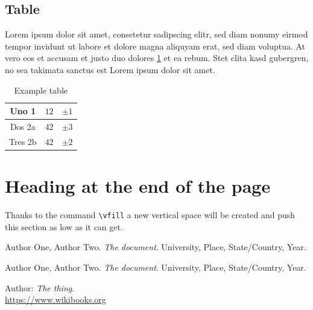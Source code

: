 \documentclass{article}				%
\begin{document}
\subsection{Table}

Lorem ipsum dolor sit amet, consetetur sadipscing elitr, sed diam nonumy eirmod tempor invidunt ut labore et dolore magna aliquyam erat, sed diam voluptua. At vero eos et accusam et justo duo dolores \ref{tab:example-table} et ea rebum. Stet clita kasd gubergren, no sea takimata sanctus est Lorem ipsum dolor sit amet.
\begin{table}[!h]	
	\centering
	\begin{tabular}{c|r l}	 
		Uno 1 & $12$ & $\pm 1$ \\   \hline	 
		Dos 2a & $42$ & $\pm 3$ \\	 
		Tres 2b & $42$ & $\pm 2$ 	
	\end{tabular}	
	\caption{Example table}	
	\label{tab:example-table}
\end{table}


\vfill

\section{Heading at the end of the page}

Thanks to the command \verb|\vfill| a new vertical space will be created and push this section as low as it can get.

\newpage

\begin{thebibliography}{3} %
	
	Author One, Author Two.
	\textit{The document}. 
	University, Place, State/Country, Year.
	
	Author One, Author Two.
	\textit{The document}. 
	University, Place, State/Country, Year.
	
	Author: \textit{The thing}. 
	\\\url{https://www.wikibooks.org}
	
\end{thebibliography}

\end{document}

